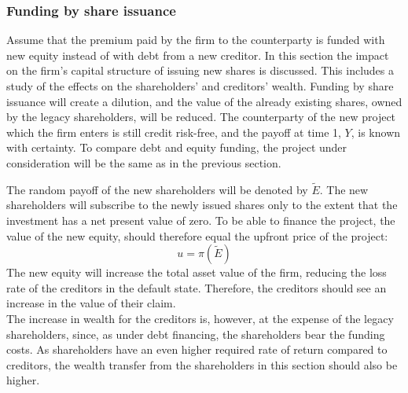 \documentclass[main.tex]{subfiles}
\begin{document}
    \subsubsection{Funding by share issuance}
    \label{sec:example-equity-issuance}
        Assume that the premium paid by the firm to the counterparty is funded with new equity instead of with debt from a new creditor. 
        In this section the impact on the firm's capital structure of issuing new shares is discussed.
        This includes a study of the effects on the shareholders' and creditors' wealth. 
        Funding by share issuance will create a dilution, and the value of the already existing shares, owned by the legacy shareholders, will be reduced. 
        The counterparty of the new project which the firm enters is still credit risk-free, 
        and the payoff at time 1, $Y$, is known with certainty. 
        To compare debt and equity funding, 
        the project under consideration will be the same as in the previous section.

        The random payoff of the new shareholders will be denoted by $\tilde{E}$.
        The new shareholders will subscribe to the newly issued shares 
        only to the extent that the investment has a net present value of zero.
        To be able to finance the project, the value of the new equity,
        should therefore equal the upfront price of the project:
        \begin{equation}\label{eqn:derivative-zero-npv}
            u = \pi(\tilde{E})
        \end{equation}
        The new equity will increase the total asset value of the firm,
        reducing the loss rate of the creditors in the default state.
        Therefore, the creditors should see an increase in the value of their claim.\\
        The increase in wealth for the creditors is, however, at the expense of the legacy shareholders,
        since, as under debt financing, the shareholders bear the funding costs.
        As shareholders have an even higher required rate of return compared to creditors,
        the wealth transfer from the shareholders in this section should also be higher.
\end{document}

